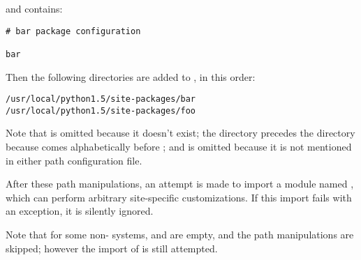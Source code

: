 and  contains:

\bcode\begin{verbatim}
# bar package configuration

bar
\end{verbatim}\ecode

Then the following directories are added to , in this
order:

\bcode\begin{verbatim}
/usr/local/python1.5/site-packages/bar
/usr/local/python1.5/site-packages/foo
\end{verbatim}\ecode

Note that  is omitted because it doesn't exist; the
 directory precedes the  directory because
 comes alphabetically before ; and
 is omitted because it is not mentioned in either path
configuration file.

After these path manipulations, an attempt is made to import a module
named , which can
perform arbitrary site-specific customizations.  If this import fails
with an  exception, it is silently ignored.

Note that for some non-\UNIX{} systems,  and
 are empty, and the path manipulations are
skipped; however the import of
 is still attempted.
